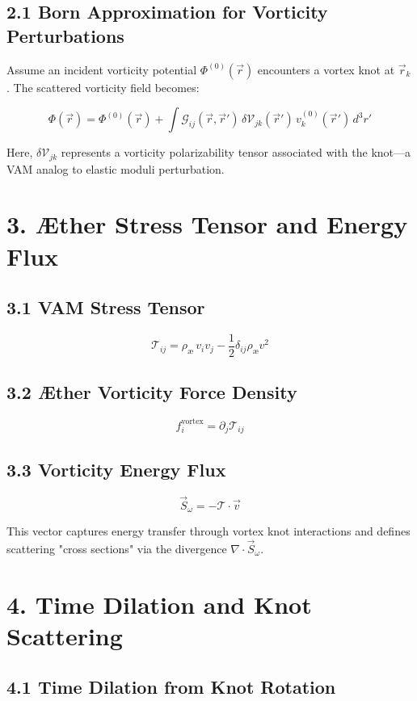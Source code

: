 \subsection*{2.1 Born Approximation for Vorticity Perturbations}

Assume an incident vorticity potential \(\Phi^{(0)}(\vec{r})\) encounters a vortex knot at \(\vec{r}_k\). The scattered vorticity field becomes:

\[
\Phi(\vec{r}) = \Phi^{(0)}(\vec{r}) + \int \mathcal{G}_{ij}(\vec{r}, \vec{r}') \, \delta \mathcal{V}_{jk}(\vec{r}') \, v_k^{(0)}(\vec{r}') \, d^3r'
\]

Here, \(\delta \mathcal{V}_{jk}\) represents a vorticity polarizability tensor associated with the knot—a VAM analog to elastic moduli perturbation.

\section*{3. Æther Stress Tensor and Energy Flux}

\subsection*{3.1 VAM Stress Tensor}

\[
\mathcal{T}_{ij} = \rho_{\text{\ae}} \, v_i v_j - \frac{1}{2} \delta_{ij} \rho_{\text{\ae}} v^2
\]

\subsection*{3.2 Æther Vorticity Force Density}

\[
f_i^{\text{vortex}} = \partial_j \mathcal{T}_{ij}
\]

\subsection*{3.3 Vorticity Energy Flux}

\[
\vec{S}_\omega = - \mathcal{T} \cdot \vec{v}
\]

This vector captures energy transfer through vortex knot interactions and defines scattering "cross sections" via the divergence \(\nabla \cdot \vec{S}_\omega\).

\section*{4. Time Dilation and Knot Scattering}

\subsection*{4.1 Time Dilation from Knot Rotation}

